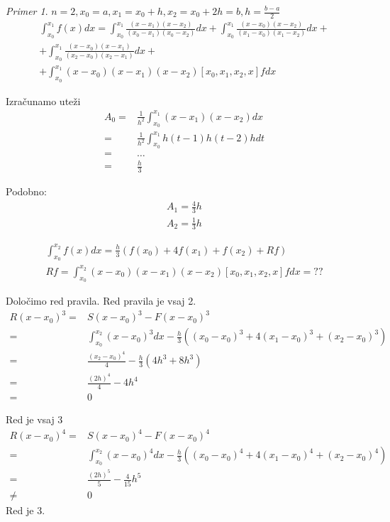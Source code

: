 \documentclass[a4paper,12pt]{article}
\theoremstyle{definition}
\theoremstyle{remark}
\newtheorem*{ex}{Primer}
\begin{document}
\begin{ex}
    $n = 2, x_0 = a, x_1 = x_0 + h, x_2 = x_0 + 2h = b, h = \frac{b-a}{2}$
    \begin{multline*}
        \int_{x_0}^{x_1} f(x) dx = \int_{x_0}^{x_1} \frac{(x-x_1)(x-x_2)}{(x_0-x_1)(x_0-x_2)} dx + \int_{x_0}^{x_1} \frac{(x-x_0)(x-x_2)}{(x_1-x_0)(x_1-x_2)} dx + \\
        + \int_{x_0}^{x_1} \frac{(x-x_0)(x-x_1)}{(x_2-x_0)(x_2-x_1)} dx + \\
        + \int_{x_0}^{x_1} (x-x_0)(x-x_1)(x-x_2) [x_0, x_1, x_2, x] f dx
    \end{multline*}
    
    Izračunamo uteži
    \begin{align*}
        A_0 =& \frac{1}{h^2} \int_{x_0}^{x_1} (x-x_1)(x-x_2) dx \\
            =& \frac{1}{h^2} \int_{x_0}^{x_1} h(t-1) h(t-2) h dt \\
            =& \dots \\
            =& \frac{h}{3}
    \end{align*}

    Podobno:
    \begin{align*}
        A_1 = \frac{4}{3}h\\
        A_2 = \frac{1}{3} h
    \end{align*}


    \begin{gather*}
        \int_{x_0}^{x_2} f(x) dx = \frac{h}{3} (f(x_0) + 4f(x_1) + f(x_2) + Rf) \\
        Rf = \int_{x_0}^{x_2} (x-x_0)(x-x_1)(x-x_2)[x_0, x_1, x_2, x] f dx = ??
    \end{gather*}

    Določimo red pravila.
    Red pravila je vsaj 2.
    \begin{align*}
        R(x-x_0)^3 =& S(x-x_0)^3 - F(x-x_0)^3 \\
                   =& \int_{x_0}^{x_2} (x-x_0)^3 dx - \frac{h}{3} ((x_0-x_0)^3 + 4(x_1-x_0)^3 + (x_2 - x_0)^3) \\
                   =& \frac{(x_2-x_0)^4}{4} - \frac{h}{3}(4h^3 + 8h^3) \\
                   =& \frac{(2h)^4}{4} - 4h^4 \\
                   =& 0
    \end{align*}
    
    Red je vsaj 3
    \begin{align*}
        R(x-x_0)^4 =& S(x-x_0)^4 - F(x-x_0)^4 \\
                   =& \int_{x_0}^{x_2} (x-x_0)^4 dx - \frac{h}{3} ((x_0-x_0)^4 + 4(x_1-x_0)^4 + (x_2 - x_0)^4) \\
                   =& \frac{(2h)^5}{5} - \frac{4}{15}h^5 \\
                   \neq& 0
    \end{align*}
    Red je 3.


\end{ex}
\end{document}
